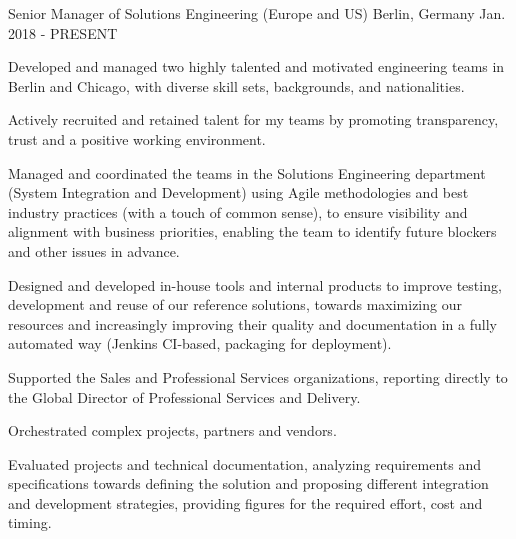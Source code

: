 



\begin{cventries}

  \cventry
    {Senior Manager of Solutions Engineering (Europe and US)} %
    {} %
    {Berlin, Germany} %
    {Jan. 2018 - PRESENT} %
    {
      \begin{cvitems} %
        \item {Developed and managed two highly talented and motivated engineering teams in Berlin and Chicago, with diverse skill sets, backgrounds, and nationalities.}
        \item {Actively recruited and retained talent for my teams by promoting transparency, trust and a positive working environment.}
        \item {Managed and coordinated the teams in the Solutions Engineering department (System Integration and Development) using Agile methodologies and best industry practices (with a touch of common sense), to ensure visibility and alignment with business priorities, enabling the team to identify future blockers and other issues in advance.}
        \item {Designed and developed in-house tools and internal products to improve testing, development and reuse of our reference solutions, towards maximizing our resources and increasingly improving their quality and documentation in a fully automated way (Jenkins CI-based, packaging for deployment).}
        \item {Supported the Sales and Professional Services organizations, reporting directly to the Global Director of Professional Services and Delivery.}
        \item {Orchestrated complex projects, partners and vendors.}
        \item {Evaluated projects and technical documentation, analyzing requirements and specifications towards defining the solution and proposing different integration and development strategies, providing figures for the required effort, cost and timing.}

\end{cvitems}}
\end{cventries}
